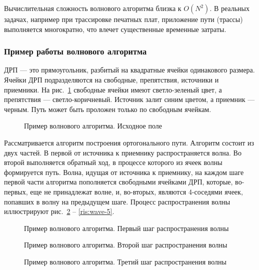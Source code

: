 Вычислительная сложность волнового алгоритма близка к $O(N^2)$.
В реальных задачах, например при трассировке печатных плат, приложение пути (трассы) выполняется многократно, что влечет существенные временные затраты. \cite{graph-wave}

\subsubsection{Пример работы волнового алгоритма}


ДРП --- это прямоугольник, разбитый на квадратные ячейки одинакового размера. 
Ячейки ДРП подразделяются на свободные, препятствия, источники и приемники. 
На рис.~\ref{ris:wave-1} свободные ячейки имеют светло-зеленый цвет, а препятствия --- светло-коричневый.
Источник залит синим цветом, а приемник --- черным.
Путь может быть проложен только по свободным ячейкам.
\begin{figure}[ht]
\caption{Пример волнового алгоритма. Исходное поле}
\label{ris:wave-1}
\end{figure}

Рассматривается алгоритм построения ортогонального пути. 
Алгоритм состоит из двух частей. 
В первой от источника к приемнику распространяется волна. 
Во второй выполняется обратный ход, в процессе которого из ячеек волны формируется путь.
Волна, идущая от источника к приемнику, на каждом шаге первой части алгоритма пополняется свободными ячейками ДРП, которые, во-первых, еще не принадлежат волне, и, во-вторых, являются 4-соседями ячеек, попавших в волну на предыдущем шаге.
Процесс распространения волны иллюстрируют рис.~\ref{ris:wave-2} -- \ref{ris:wave-5}.

\begin{figure}[ht]
\caption{Пример волнового алгоритма. Первый шаг распространения волны}
\label{ris:wave-2}
\end{figure}

\begin{figure}[ht]
\caption{Пример волнового алгоритма. Второй шаг распространения волны}
\label{ris:wave-3}
\end{figure}

\begin{figure}[h!t]
\caption{Пример волнового алгоритма. Третий шаг распространения волны}
\label{ris:wave-4}
\end{figure}

